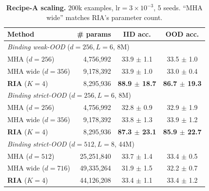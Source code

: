\documentclass{article}
\begin{document}
\begin{table}[h]
\centering
\caption{\textbf{Recipe-A scaling.} 200k examples,
$\mathrm{lr}{=}3\!\times\!10^{-3}$, 5 seeds. ``MHA wide'' matches
RIA's parameter count.}
\label{tab:scaling-A}
\begin{tabular}{lrcc}
\toprule
Method & \# params & IID acc. & OOD acc. \\
\midrule
\multicolumn{4}{l}{\textit{Binding weak-OOD} ($d{=}256, L{=}6$, 8M)} \\
\hspace{1em} MHA ($d{=}256$)            & 4,756,992 & 33.9 $\pm$ 1.1 & 33.5 $\pm$ 1.0 \\
\hspace{1em} MHA wide ($d{=}356$)       & 9,178,392 & 33.9 $\pm$ 1.0 & 33.0 $\pm$ 0.4 \\
\hspace{1em} \textbf{RIA} ($K{=}4$)     & 8,295,936 & \textbf{88.9 $\pm$ 18.7} & \textbf{86.7 $\pm$ 19.3} \\
\midrule
\multicolumn{4}{l}{\textit{Binding strict-OOD} ($d{=}256, L{=}6$, 8M)} \\
\hspace{1em} MHA ($d{=}256$)            & 4,756,992 & 32.8 $\pm$ 0.9 & 32.9 $\pm$ 1.9 \\
\hspace{1em} MHA wide ($d{=}356$)       & 9,178,392 & 33.8 $\pm$ 1.3 & 33.9 $\pm$ 1.2 \\
\hspace{1em} \textbf{RIA} ($K{=}4$)     & 8,295,936 & \textbf{87.3 $\pm$ 23.1} & \textbf{85.9 $\pm$ 22.7} \\
\midrule
\multicolumn{4}{l}{\textit{Binding strict-OOD} ($d{=}512, L{=}8$, 44M)} \\
\hspace{1em} MHA ($d{=}512$)            & 25,251,840 & 33.7 $\pm$ 1.4 & 33.4 $\pm$ 0.5 \\
\hspace{1em} MHA wide ($d{=}716$)       & 49,335,264 & 31.9 $\pm$ 1.5 & 32.2 $\pm$ 0.7 \\
\hspace{1em} \textbf{RIA} ($K{=}4$)     & 44,126,208 & 33.4 $\pm$ 1.1 & 33.4 $\pm$ 1.2 \\
\bottomrule
\end{tabular}
\end{table}
\end{document}
